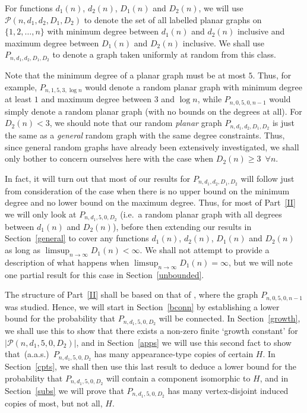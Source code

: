 \documentclass{article}
\newtheorem{Proof of Theorem}{Proof of Theorem}
\begin{document}
For functions $d_{1}(n)$, $d_{2}(n)$, $D_{1}(n)$ and $D_{2}(n)$,
we will use $\mathcal{P}(n,d_{1},d_{2},D_{1},D_{2})$ 
to denote the set of all labelled planar graphs on $\{ 1,2, \ldots, n \}$
with minimum degree between $d_{1}(n)$ and $d_{2}(n)$ inclusive
and maximum degree between $D_{1}(n)$ and $D_{2}(n)$ inclusive.
We shall use $P_{n,d_{1},d_{2},D_{1},D_{2}}$ to denote a graph taken uniformly at random from this class.

Note that the minimum degree of a planar graph must be at most $5$.
Thus, for example, $P_{n,1,5,3,\log n}$ would denote 
a random planar graph with minimum degree at least $1$ and maximum degree between $3$ and $\log n$,
while $P_{n,0,5,0,n-1}$ would simply denote a random planar graph
(with no bounds on the degrees at all).
For $D_{2}(n)<3$, we should note that our random \textit{planar} graph 
$P_{n,d_{1},d_{2},D_{1},D_{2}}$ is just the same as a \textit{general} random graph 
with the same degree constraints.
Thus, 
since general random graphs have already been extensively investigated,
we shall only bother to concern ourselves here with the case when $D_{2}(n) \geq 3$~$\forall n$. 

In fact, it will turn out that most of our results for $P_{n,d_{1},d_{2},D_{1},D_{2}}$
will follow just from consideration of the case 
when there is no upper bound on the minimum degree and no lower bound on the maximum degree.
Thus, for most of Part~\ref{II} we will only look at $P_{n,d_{1},5,0,D_{2}}$
(i.e.~a random planar graph with all degrees between $d_{1}(n)$ and $D_{2}(n)$),
before then extending our results in Section~\ref{general} 
to cover any functions $d_{1}(n)$, $d_{2}(n)$, $D_{1}(n)$ and $D_{2}(n)$ 
as long as $\limsup_{n \to \infty} D_{1}(n) < \infty$.
We shall not attempt to provide a description of what happens when 
$\limsup_{n \to \infty} D_{1}(n) = \infty$,
but we will note one partial result for this case in Section~\ref{unbounded}.

The structure of Part~\ref{II} shall be based on that of \cite{mcd},
where the graph $P_{n,0,5,0,n-1}$ was studied.
Hence, we will start in Section~\ref{bconn}
by establishing a lower bound for the probability that $P_{n,d_{1},5,0,D_{2}}$ will be connected.
In Section~\ref{growth}, we shall use this to show  
that there exists a non-zero finite `growth constant' for $|\mathcal{P}(n,d_{1},5,0,D_{2})|$,
and in Section~\ref{apps} we will use this second fact to show 
that~(a.a.s.)~$P_{n,d_{1},5,0,D_{2}}$ has many appearance-type copies of certain $H$.
In Section~\ref{cpts}, we shall then use this last result to
deduce a lower bound for the probability that $P_{n,d_{1},5,0,D_{2}}$ will contain a component isomorphic to $H$,
and in Section~\ref{subs}
we will prove that 
$P_{n,d_{1},5,0,D_{2}}$ has many vertex-disjoint induced copies of most, but not all, $H$.
\end{document}
